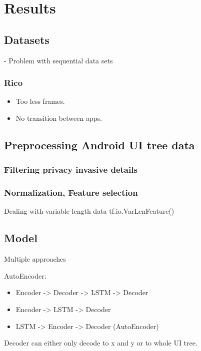 \chapter{Results}

\section{Datasets}

- Problem with sequential data sets

\subsection{Rico}

\begin{itemize}
  \item Too less frames.
  \item No transition between apps.
\end{itemize}

\section{Preprocessing Android UI tree data}
\subsection{Filtering privacy invasive details}
\subsection{Normalization, Feature selection}

Dealing with variable length data tf.io.VarLenFeature()

\section{Model}


Multiple approaches

AutoEncoder:

\begin{itemize}
  \item Encoder -> Decoder -> LSTM -> Decoder
  \item Encoder -> LSTM -> Decoder
  \item LSTM -> Encoder -> Decoder (AutoEncoder)
\end{itemize}

Decoder can either only decode to x and y or to whole UI tree.

